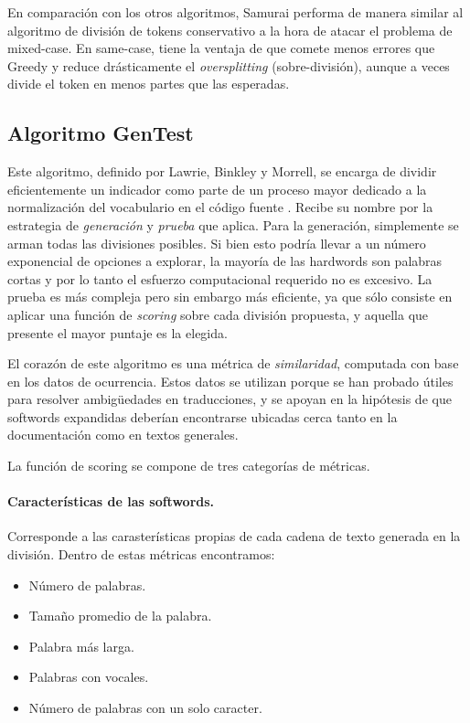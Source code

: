 En comparación con los otros algoritmos, Samurai performa de manera similar al algoritmo de división de tokens conservativo a la hora de atacar el problema de mixed-case.
En same-case, tiene la ventaja de que comete menos errores que Greedy y reduce drásticamente el \textit{oversplitting} (sobre-división), aunque a veces divide el token en menos partes que las esperadas.

\subsection{Algoritmo GenTest}
Este algoritmo, definido por Lawrie, Binkley y Morrell, se encarga de dividir eficientemente un indicador como parte de un proceso mayor dedicado a la normalización del vocabulario en el código fuente \cite{LawrieBinkleyMorrell2010}.
Recibe su nombre por la estrategia de \textit{generación} y \textit{prueba} que aplica.
Para la generación, simplemente se arman todas las divisiones posibles.
Si bien esto podría llevar a un número exponencial de opciones a explorar, la mayoría de las hardwords son palabras cortas y por lo tanto el esfuerzo computacional requerido no es excesivo.
La prueba es más compleja pero sin embargo más eficiente, ya que sólo consiste en aplicar una función de \textit{scoring} sobre cada división propuesta, y aquella que presente el mayor puntaje es la elegida.

El corazón de este algoritmo es una métrica de \textit{similaridad}, computada con base en los datos de ocurrencia.
Estos datos se utilizan porque se han probado útiles para resolver ambigüedades en traducciones, y se apoyan en la hipótesis de que softwords expandidas deberían encontrarse ubicadas cerca tanto en la documentación como en textos generales.

La función de scoring se compone de tres categorías de métricas.
\paragraph{Características de las softwords.}
Corresponde a las carasterísticas propias de cada cadena de texto generada en la división.
Dentro de estas métricas encontramos:
\begin{itemize}
  \item Número de palabras.
  \item Tamaño promedio de la palabra.
  \item Palabra más larga.
  \item Palabras con vocales.
  \item Número de palabras con un solo caracter.
\end{itemize}

